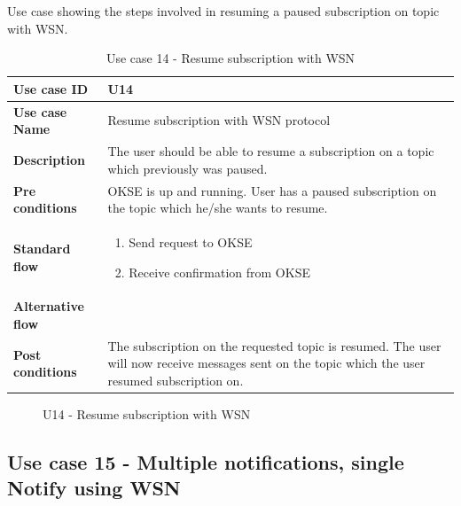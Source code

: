 Use case showing the steps involved in resuming a paused subscription on topic with WSN. 

\begin{table}[ht!]
\centering
\begin{tabular}{|l|p{5cm}|}
\hline
\textbf{Use case ID} & U14 \\ \hline
\textbf{Use case Name} & Resume subscription with WSN protocol\\ \hline
\textbf{Description} & The user should be able to resume a subscription on a topic which previously was paused. \\ \hline
\textbf{Pre conditions} & OKSE is up and running. User has a paused subscription on the topic which he/she wants to resume. \\ \hline
\textbf{Standard flow} & \begin{enumerate}
\item Send request to OKSE
\item Receive confirmation from OKSE	
\end{enumerate} \\ \hline
\textbf{Alternative flow} & \\ \hline
\textbf{Post conditions} & The subscription on the requested topic is resumed. The user will now receive messages sent on the topic which the user resumed subscription on.  \\ \hline
\end{tabular}
\caption{Use case 14 - Resume subscription with WSN}
\label{uc14}
\end{table}

\begin{center}
  \begin{figure}[ht!]
    \caption{U14 - Resume subscription with WSN}
    \label{fig:u14}
  \end{figure}
\end{center}

\clearpage

\subsection{Use case 15 - Multiple notifications, single Notify using WSN }
\label{subsec:requirements_engineering-use_cases-}

